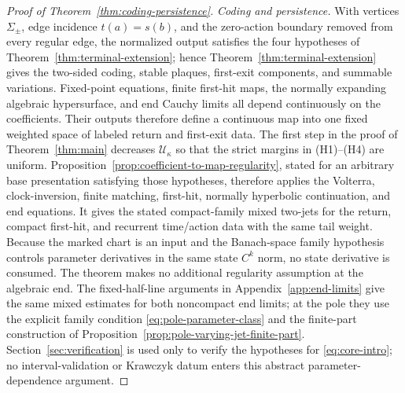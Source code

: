 \documentclass[11pt]{amsart}
\numberwithin{equation}{section}
\theoremstyle{definition}
\theoremstyle{remark}
\newcommand{\cU}{\mathcal U}
\begin{document}
\begin{proof}[Proof of Theorem~\ref{thm:coding-persistence}]
\emph{Coding and persistence.}
With vertices $\Sigma_\pm$, edge incidence $t(a)=s(b)$, and the
zero-action boundary
removed from every regular edge, the normalized output satisfies the four
hypotheses of Theorem~\ref{thm:terminal-extension}; hence
Theorem~\ref{thm:terminal-extension} gives the two-sided coding, stable
plaques, first-exit components, and summable variations.  Fixed-point
equations, finite first-hit maps, the normally expanding algebraic
hypersurface, and end
Cauchy limits all depend continuously on the coefficients.  Their outputs therefore define a
continuous map into one fixed weighted space of labeled return and
first-exit data.
The first step in the proof of Theorem~\ref{thm:main} decreases
$\cU_\kappa$ so that the strict margins in \textup{(H1)}--\textup{(H4)}
are uniform.  Proposition~\ref{prop:coefficient-to-map-regularity}, stated
for an arbitrary base presentation satisfying those hypotheses, therefore
applies the Volterra, clock-inversion, finite matching, first-hit,
normally hyperbolic continuation, and end equations.  It gives the stated compact-family mixed two-jets
for the return, compact first-hit, and recurrent time/action data with the
same tail weight.  Because the marked chart is an input and the
Banach-space family hypothesis controls parameter derivatives in the same
state $C^k$ norm, no state derivative is consumed.  The theorem makes no
additional regularity assumption at the algebraic end.  The fixed-half-line
arguments in Appendix~\ref{app:end-limits} give the same mixed estimates
for both noncompact end limits; at the pole they use the explicit family
condition \eqref{eq:pole-parameter-class} and the finite-part construction
of Proposition~\ref{prop:pole-varying-jet-finite-part}.
Section~\ref{sec:verification} is used only to verify the hypotheses for
\eqref{eq:core-intro}; no interval-validation or Krawczyk datum enters this
abstract parameter-dependence argument.
\end{proof}
\end{document}
